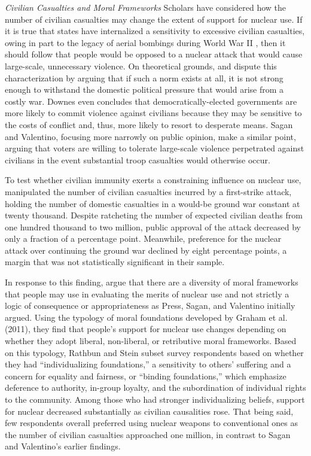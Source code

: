 \documentclass[12pt]{article}
\begin{document}
\textit{Civilian Casualties and Moral Frameworks}
\noindent
Scholars have considered how the number of civilian casualties may change the extent of support for nuclear use. If it is true that states have internalized a sensitivity to excessive civilian casualties, owing in part to the legacy of aerial bombings during World War II \citep{pinker_better_2011, thomas_ethics_2014}, then it should follow that people would be opposed to a nuclear attack that would cause large-scale, unnecessary violence. On theoretical grounds, \citet{downes_desperate_2006} and \citet{sagan_revisiting_2017} dispute this characterization by arguing that if such a norm exists at all, it is not strong enough to withstand the domestic political pressure that would arise from a costly war. Downes even concludes that democratically-elected governments are more likely to commit violence against civilians because they may be sensitive to the costs of conflict and, thus, more likely to resort to desperate means. Sagan and Valentino, focusing more narrowly on public opinion, make a similar point, arguing that voters are willing to tolerate large-scale violence perpetrated against civilians in the event substantial troop casualties would otherwise occur.

To test whether civilian immunity exerts a constraining influence on nuclear use, \citet{sagan_revisiting_2017} manipulated the number of civilian casualties incurred by a first-strike attack, holding the number of domestic casualties in a would-be ground war constant at twenty thousand. Despite ratcheting the number of expected civilian deaths from one hundred thousand to two million, public approval of the attack decreased by only a fraction of a percentage point. Meanwhile, preference for the nuclear attack over continuing the ground war declined by eight percentage points, a margin that was not statistically significant in their sample.

In response to this finding, \citet{rathbun_greater_2019} argue that there are a diversity of moral frameworks that people may use in evaluating the merits of nuclear use and not strictly a logic of consequence or appropriateness as Press, Sagan, and Valentino initially argued. Using the typology of moral foundations developed by Graham et al. (2011), they find that people's support for nuclear use changes depending on whether they adopt liberal, non-liberal, or retributive moral frameworks. Based on this typology, Rathbun and Stein subset survey respondents based on whether they had “individualizing foundations,” a sensitivity to others' suffering and a concern for equality and fairness, or “binding foundations,” which emphasize deference to authority, in-group loyalty, and the subordination of individual rights to the community. Among those who had stronger individualizing beliefs, support for nuclear decreased substantially as civilian causalities rose. That being said, few respondents overall preferred using nuclear weapons to conventional ones as the number of civilian casualties approached one million, in contrast to Sagan and Valentino's earlier findings.
\end{document}
